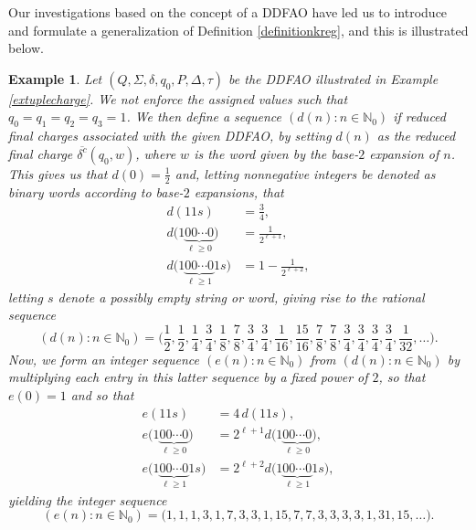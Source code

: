 \documentclass[12pt]{article}
\newtheorem{example}{Example}
\begin{document}
 Our investigations based on the concept of a DDFAO have led us to introduce and formulate a generalization of Definition 
 \ref{definitionkreg}, and this is illustrated below. 

\begin{example}\label{exeseq}
 Let $(Q, \Sigma, \delta, q_0, P, \Delta, \tau)$ be the DDFAO 
 illustrated in Example \ref{extuplecharge}. 
 We not enforce the assigned values such that $q_{0} = q_{1} = q_{2} = q_{3} = 1$. 
 We then define a sequence $(d(n) : n \in \mathbb{N}_{0} )$ if 
 reduced final charges associated with the given DDFAO, 
 by setting $d(n)$ as the reduced final charge 
 $ \overline{\delta^{c}}( q_0, w )$, where $w$ is the word given by the base-$2$ expansion of $n$. 
 This gives us that $d(0) = \frac{1}{2}$ and, letting nonnegative integers be denoted 
 as binary words according to base-$2$ expansions, that 
\begin{align}
 d(11s) & = \frac{3}{4}, \label{drelation1} \\ 
 d\big( 1\underbrace{00\cdots{0}}_{\ell \geq 0} \big) & = \frac{1}{2^{\ell + 1}}, \label{drelation1} \\ 
 d\big( 1\underbrace{00\cdots{0}}_{\ell \geq 1}1s \big) & = 1 - \frac{1}{2^{\ell + 2}}, \label{drelation3}
\end{align}
 letting $s$ denote a possibly empty string or word, giving rise to the rational sequence 
 $$ \left( d(n) : n \in \mathbb{N}_{0} \right) 
 = \Big( \frac{1}{2},\frac{1}{2},\frac{1}{4},\frac{3}{4},\frac{1}{8},\frac{7}{8},\frac{3}{4},\frac{3}{4},\frac{1}{16},\frac{15}{16},\frac{7}{8},
\frac{7}{8},\frac{3}{4},\frac{3}{4},\frac{3}{4},\frac{3}{4},\frac{1}{32}, \ldots \Big). $$ 
 Now, we form an integer sequence 
 $(e(n) : n \in \mathbb{N}_{0})$ from $(d(n) : n \in \mathbb{N}_{0})$ 
 by multiplying each entry in this latter sequence by a fixed power of $2$, so that 
 $e(0) = 1$ and so that 
\begin{align*}
 e(11s) & = 4 \, d(11s), \\ 
 e\big( 1\underbrace{00\cdots{0}}_{\ell \geq 0} \big) & = 
 2^{\ell + 1} d\big( 1\underbrace{00\cdots{0}}_{\ell \geq 0} \big), \\
 e\big( 1\underbrace{00\cdots{0}}_{\ell \geq 1}1s \big) 
 & = 2^{\ell + 2} d\big( 1\underbrace{00\cdots{0}}_{\ell \geq 1}1s \big), 
\end{align*}
 yielding the integer sequence
\begin{equation}\label{numericaleseq}
 (e(n) : n \in \mathbb{N}_{0}) 
 = \big( 1, 1, 1, 3, 1, 7, 3, 3, 1, 15, 7, 7, 3, 3, 3, 3, 1, 31, 15, \ldots \big). 

\end{equation}
\end{example}
\end{document}
